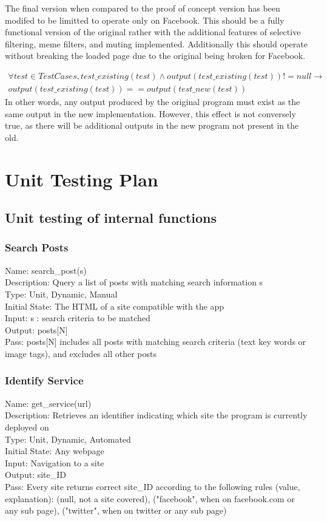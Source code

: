 \documentclass[12pt, titlepage]{article}
\begin{document}
\begin{enumerate}
The final version when compared to the proof of concept version has been modifed to be limitted to operate only on Facebook. This should be a fully functional version of the original rather with the additional features of selective filtering, meme filters, and muting implemented. Additionally this should operate without breaking the loaded page due to the original being broken for Facebook.

\begin{multline}
\forall test \in TestCases, test\_existing(test) \wedge output(test\_existing(test)) != null  \rightarrow  \\ 
output(test\_existing(test)) == output(test\_new(test))
\end{multline}
In other words, any output produced by the original program must exist as the same output in the new implementation. However, this effect is not conversely true, as there will be additional outputs in the new program not present in the old.				
\section{Unit Testing Plan}	
\subsection{Unit testing of internal functions}
\subsubsection{Search Posts}
Name: search\_post(s) \\
Description: Query a list of posts with matching search information s \\
Type: Unit, Dynamic, Manual \\
Initial State: The HTML of a site compatible with the app \\
Input: s : search criteria to be matched \\
Output: posts[N] \\
Pass: posts[N] includes all posts with matching search criteria (text key words or image tags), and excludes all other posts \\
\subsubsection{Identify Service}
Name: get\_service(url) \\
Description: Retrieves an identifier indicating which site the program is currently deployed on \\
Type: Unit, Dynamic, Automated \\
Initial State: Any webpage \\
Input: Navigation to a site \\
Output: site\_ID \\
Pass: Every site returns correct site\_ID according to the following rules (value, explanation): (null, not a site covered), ("facebook", when on facebook.com or any sub page), ("twitter", when on twitter or any sub page) \\

\end{enumerate}
\end{document}
